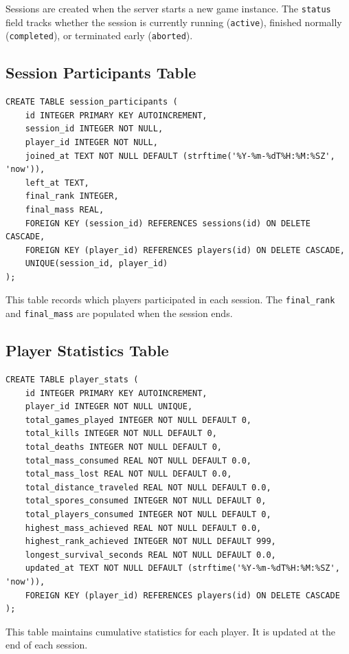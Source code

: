 \documentclass[11pt]{article}
\begin{document}
Sessions are created when the server starts a new game instance. The \texttt{status} field tracks whether the session is currently running (\texttt{active}), finished normally (\texttt{completed}), or terminated early (\texttt{aborted}).

\subsection{Session Participants Table}

\begin{verbatim}
CREATE TABLE session_participants (
    id INTEGER PRIMARY KEY AUTOINCREMENT,
    session_id INTEGER NOT NULL,
    player_id INTEGER NOT NULL,
    joined_at TEXT NOT NULL DEFAULT (strftime('%Y-%m-%dT%H:%M:%SZ', 'now')),
    left_at TEXT,
    final_rank INTEGER,
    final_mass REAL,
    FOREIGN KEY (session_id) REFERENCES sessions(id) ON DELETE CASCADE,
    FOREIGN KEY (player_id) REFERENCES players(id) ON DELETE CASCADE,
    UNIQUE(session_id, player_id)
);
\end{verbatim}

This table records which players participated in each session. The \texttt{final\_rank} and \texttt{final\_mass} are populated when the session ends.

\subsection{Player Statistics Table}

\begin{verbatim}
CREATE TABLE player_stats (
    id INTEGER PRIMARY KEY AUTOINCREMENT,
    player_id INTEGER NOT NULL UNIQUE,
    total_games_played INTEGER NOT NULL DEFAULT 0,
    total_kills INTEGER NOT NULL DEFAULT 0,
    total_deaths INTEGER NOT NULL DEFAULT 0,
    total_mass_consumed REAL NOT NULL DEFAULT 0.0,
    total_mass_lost REAL NOT NULL DEFAULT 0.0,
    total_distance_traveled REAL NOT NULL DEFAULT 0.0,
    total_spores_consumed INTEGER NOT NULL DEFAULT 0,
    total_players_consumed INTEGER NOT NULL DEFAULT 0,
    highest_mass_achieved REAL NOT NULL DEFAULT 0.0,
    highest_rank_achieved INTEGER NOT NULL DEFAULT 999,
    longest_survival_seconds REAL NOT NULL DEFAULT 0.0,
    updated_at TEXT NOT NULL DEFAULT (strftime('%Y-%m-%dT%H:%M:%SZ', 'now')),
    FOREIGN KEY (player_id) REFERENCES players(id) ON DELETE CASCADE
);
\end{verbatim}

This table maintains cumulative statistics for each player. It is updated at the end of each session.
\end{document}

